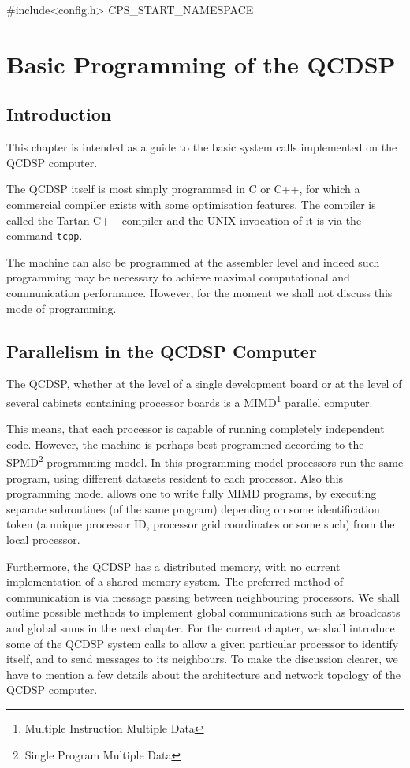 #include<config.h>
CPS_START_NAMESPACE
\chapter{Basic Programming of the QCDSP}
\section{Introduction}
This chapter is intended as a guide to the basic
system calls implemented on the QCDSP computer.

The QCDSP itself is most simply programmed in C or 
C++, for which a commercial compiler exists with
some optimisation features. The compiler is called
the Tartan C++ compiler and the UNIX invocation of it 
is via the command {\tt tcpp}. 

The machine can also be programmed at the assembler
level and  indeed such programming may be necessary to achieve
maximal computational and communication performance. However,
for the moment we shall not discuss this mode of programming. 

\section{Parallelism in the QCDSP Computer}
The QCDSP, whether at the level of a single development board
or at the level of several cabinets containing processor boards
is a MIMD\footnote{Multiple Instruction Multiple Data} parallel computer. 

This means, that each processor is capable of running completely
independent code. However, the machine is 
perhaps best programmed according to the SPMD\footnote{Single Program Multiple Data} programming model. In this programming model processors run the 
same program, using different datasets resident to each processor. Also
this programming model allows one to write fully MIMD programs, by executing
separate subroutines (of the same program) depending on some identification
token (a unique processor ID, processor grid coordinates or some such) 
from the local processor. 

Furthermore, the QCDSP has a distributed memory, with no current
implementation of a shared memory system. The preferred method of 
communication is via message passing between neighbouring processors.
We shall outline possible methods to implement global communications
such as broadcasts and global sums in the next chapter.
For the current chapter, we shall introduce some of the QCDSP system
calls to allow a given particular processor to identify itself, and 
to send messages to its neighbours. To make the discussion clearer,
we have to mention a few details about the architecture and network
topology of the QCDSP computer.

